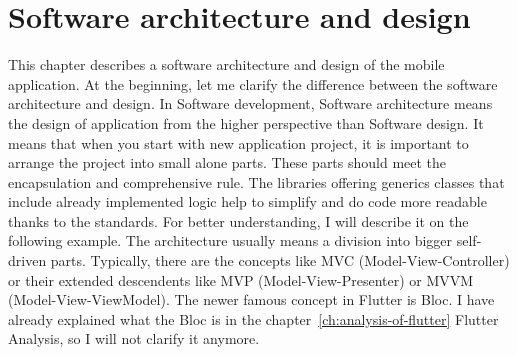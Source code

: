 \chapter{Software architecture and design}\label{ch:software-architecture-and-design}
This chapter describes a software architecture and design of the mobile application.
At the beginning, let me clarify the difference between the software architecture and design.
In Software development, Software architecture means the design of application from the higher perspective than Software design.
It means that when you start with new application project, it is important to arrange the project into small alone parts.
These parts should meet the encapsulation and comprehensive rule.
The libraries offering generics classes that include already implemented logic help to simplify and do code more readable thanks to the standards.
For better understanding, I will describe it on the following example.
The architecture usually means a division into bigger self-driven parts.
Typically, there are the concepts like MVC (Model-View-Controller) or their extended descendents like MVP (Model-View-Presenter) or MVVM (Model-View-ViewModel).
The newer famous concept in Flutter is Bloc.
I have already explained what the Bloc is in the chapter~\ref{ch:analysis-of-flutter} Flutter Analysis, so I will not clarify it anymore.



